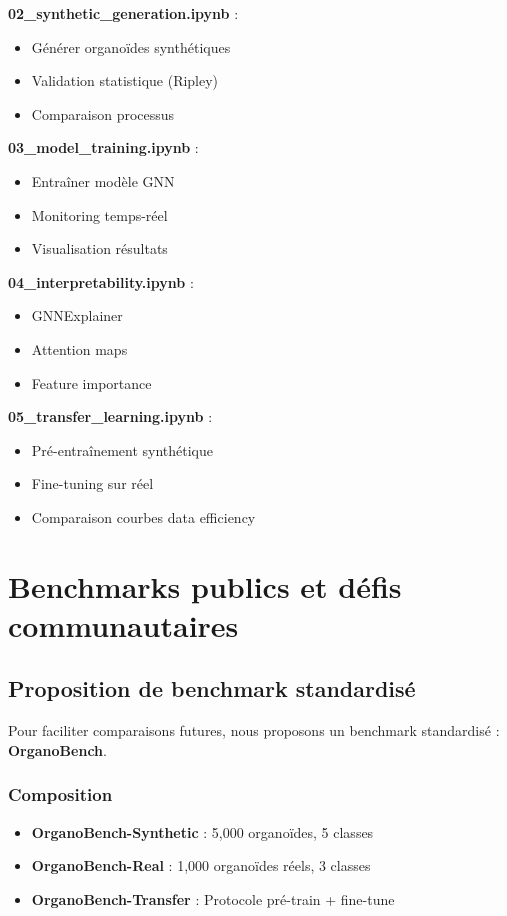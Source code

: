 \textbf{02\_synthetic\_generation.ipynb} :
\begin{itemize}
    \item Générer organoïdes synthétiques
    \item Validation statistique (Ripley)
    \item Comparaison processus
\end{itemize}

\textbf{03\_model\_training.ipynb} :
\begin{itemize}
    \item Entraîner modèle GNN
    \item Monitoring temps-réel
    \item Visualisation résultats
\end{itemize}

\textbf{04\_interpretability.ipynb} :
\begin{itemize}
    \item GNNExplainer
    \item Attention maps
    \item Feature importance
\end{itemize}

\textbf{05\_transfer\_learning.ipynb} :
\begin{itemize}
    \item Pré-entraînement synthétique
    \item Fine-tuning sur réel
    \item Comparaison courbes data efficiency
\end{itemize}

\section{Benchmarks publics et défis communautaires}

\subsection{Proposition de benchmark standardisé}

Pour faciliter comparaisons futures, nous proposons un benchmark standardisé : \textbf{OrganoBench}.

\subsubsection{Composition}

\begin{itemize}
    \item \textbf{OrganoBench-Synthetic} : 5,000 organoïdes, 5 classes
    \item \textbf{OrganoBench-Real} : 1,000 organoïdes réels, 3 classes
    \item \textbf{OrganoBench-Transfer} : Protocole pré-train + fine-tune
\end{itemize}

